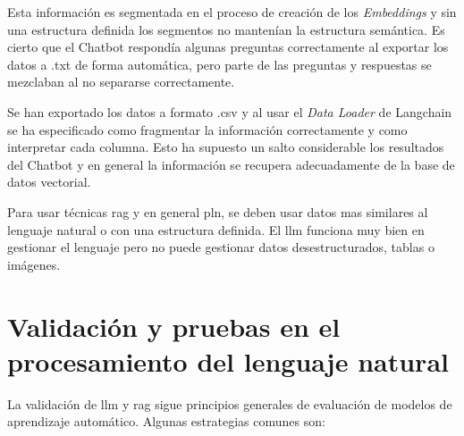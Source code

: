 Esta información es segmentada en el proceso de creación de los \textit{Embeddings} y sin una estructura definida los segmentos no mantenían la estructura semántica. Es cierto que el Chatbot respondía algunas preguntas correctamente al exportar los datos a .txt de forma automática, pero parte de las preguntas y respuestas se mezclaban al no separarse correctamente.

Se han exportado los datos a formato .csv y al usar el \textit{Data Loader} de Langchain se ha especificado como fragmentar la información correctamente y como interpretar cada columna. Esto ha supuesto un salto considerable los resultados del Chatbot y en general la información se recupera adecuadamente de la base de datos vectorial.

Para usar técnicas \acrshort{rag} y en general \acrshort{pln}, se deben usar datos mas similares al lenguaje natural o con una estructura definida. El \acrshort{llm} funciona muy bien en gestionar el lenguaje pero no puede gestionar datos desestructurados, tablas o imágenes.

\section{Validación y pruebas en el procesamiento del lenguaje natural}

La validación de \acrshort{llm} y \acrshort{rag} sigue principios generales de evaluación de modelos de aprendizaje automático. Algunas estrategias comunes son:

